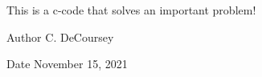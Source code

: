 This is a c-\/code that solves an important problem!

\begin{DoxyAuthor}{Author}
C. De\+Coursey
\end{DoxyAuthor}
\begin{DoxyDate}{Date}
November 15, 2021 
\end{DoxyDate}
